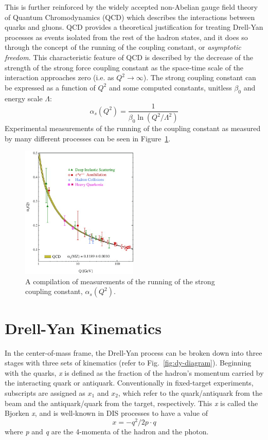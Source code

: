 This is further reinforced by the widely accepted non-Abelian gauge field theory of Quantum Chromodynamics (QCD) which describes the interactions between quarks and gluons. QCD provides a theoretical justification for treating Drell-Yan processes as events isolated from the rest of the hadron states, and it does so through the concept of the running of the coupling constant, or \emph{asymptotic freedom}\cite{Bethke:2006ac}. This characteristic feature of QCD is described by the decrease of the strength of the strong force coupling constant as the space-time scale of the interaction approaches zero (i.e. as $Q^2 \rightarrow \infty$). The strong coupling constant can be expressed as a function of $Q^2$ and some computed constants, unitless $\beta_0$ and energy scale $\Lambda$:
\begin{equation}
\alpha_s(Q^2) = \frac{1}{\beta_0 \ln (Q^2/\Lambda^2)}
\end{equation}
Experimental measurements of the running of the coupling constant as measured by many different processes can be seen in Figure~\ref{fig:asymptotic-freedom}.

\begin{figure}
	\centering
	\includegraphics[height=2.5in]{figures/background/asymptotic-freedom.jpg}
	\caption{A compilation of measurements of the running of the strong coupling constant, $\alpha_s(Q^2)$.}
	\label{fig:asymptotic-freedom}
\end{figure}

\section{Drell-Yan Kinematics}

In the center-of-mass frame, the Drell-Yan process can be broken down into three stages with three sets of kinematics (refer to Fig.~\ref{fig:dy-diagram}). Beginning with the quarks, \emph{x} is defined as the fraction of the hadron's momentum carried by the interacting quark or antiquark. Conventionally in fixed-target experiments, subscripts are assigned as $x_1$ and $x_2$, which refer to the quark/antiquark from the beam and the antiquark/quark from the target, respectively. This \emph{x} is called the Bjorken \emph{x}, and is well-known in DIS processes to have a value of
\begin{equation}
x = -q^2/2 p \cdot q
\end{equation} where \emph{p} and \emph{q} are the 4-momenta of the hadron and the photon.


